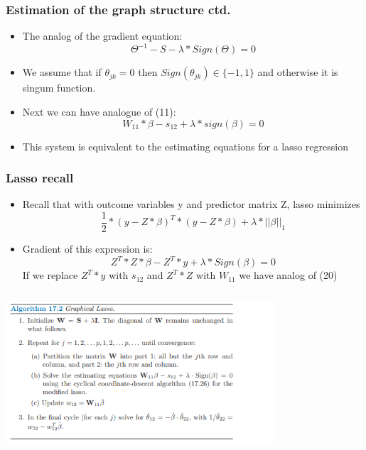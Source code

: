 \documentclass{beamer}
\begin{document}
\begin{frame}
\frametitle{Estimation of the graph structure ctd.}
\begin{itemize}
\item The analog of the gradient equation:
\begin{equation}
\Theta^{-1} - S - \lambda*Sign(\Theta) = 0
\end{equation}
\item We assume that if $\theta_{jk} = 0$ then $Sign(\theta_{jk}) \in \{-1, 1\}$ and otherwise it is singum function.
\item Next we can have analogue of (11):
\begin{equation}
W_{11}*\beta - s_{12} + \lambda * sign(\beta) = 0
\end{equation}
\item This system is equivalent to the estimating equations for a lasso regression
\end{itemize}
\end{frame}

\begin{frame}
\frametitle{Lasso recall}
\begin{itemize}
\item Recall that with outcome variables y and predictor matrix Z, lasso minimizes
\begin{equation}
\frac{1}{2} * (y - Z * \beta)^T * (y - Z * \beta) + \lambda * ||\beta||_1
\end{equation}
\item Gradient of this expression is:
\begin{equation}
Z^T*Z*\beta - Z^T * y + \lambda * Sign(\beta) = 0
\end{equation}
If we replace $Z^T *y$ with $s_{12}$ and $Z^T * Z$ with $W_{11}$ we have analog of (20)
\end{itemize}
\end{frame}
\begin{frame}
\includegraphics[width=10cm, height=6cm]{Algorithm lasso}
\end{frame}
\end{document}
